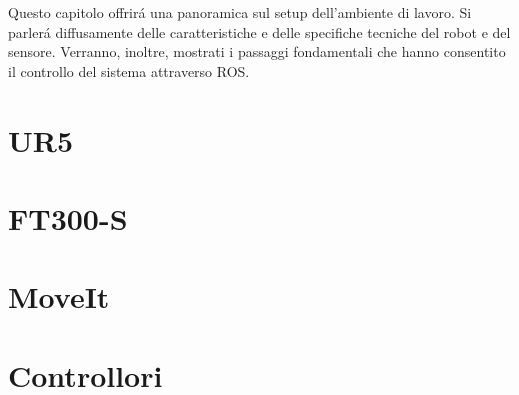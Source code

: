 Questo capitolo offrir\'{a} una panoramica sul setup dell'ambiente di lavoro. 
Si parler\'{a} diffusamente delle caratteristiche e delle specifiche tecniche del robot e del sensore. Verranno, inoltre, 
mostrati i passaggi fondamentali che hanno consentito il controllo del sistema attraverso ROS.

\section{UR5}


\section{FT300-S}


\section{MoveIt}


\section{Controllori}
